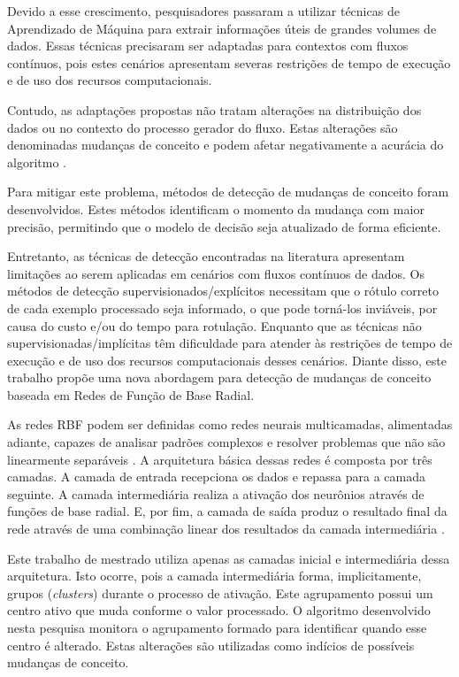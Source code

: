 \documentclass[msc, classic, a4paper]{ufbathesis}
\begin{document}
Devido a esse crescimento, pesquisadores passaram a utilizar técnicas de Aprendizado de Máquina para extrair informações úteis de grandes volumes de dados.
Essas técnicas precisaram ser adaptadas para contextos com fluxos contínuos, pois estes cenários apresentam severas restrições de tempo de execução e de uso dos recursos computacionais.

Contudo, as adaptações propostas não tratam alterações na distribuição dos dados ou no contexto do processo gerador do fluxo.
Estas alterações são denominadas mudanças de conceito e podem afetar negativamente a acurácia do algoritmo \cite{Gama:2014:SCD:2597757.2523813}.

Para mitigar este problema, métodos de detecção de mudanças de conceito foram desenvolvidos.
Estes métodos identificam o momento da mudança com maior precisão, permitindo que o modelo de decisão seja atualizado de forma eficiente.

Entretanto, as técnicas de detecção encontradas na literatura apresentam limitações ao serem aplicadas em cenários com fluxos contínuos de dados.
Os métodos de detecção supervisionados/explícitos necessitam que o rótulo correto de cada exemplo processado seja informado, o que pode torná-los inviáveis, por causa do custo e/ou do tempo para rotulação.
Enquanto que as técnicas não supervisionadas/implícitas têm dificuldade para atender às restrições de tempo de execução e de uso dos recursos computacionais desses cenários.
Diante disso, este trabalho propõe uma nova abordagem para detecção de mudanças de conceito baseada em Redes de Função de Base Radial.

As redes RBF podem ser definidas como redes neurais multicamadas, alimentadas adiante, capazes de analisar padrões complexos e resolver problemas que não são linearmente separáveis \cite{Braga:RedesNeuraisTeoriaAplicacoes}.
A arquitetura básica dessas redes é composta por três camadas.
A camada de entrada recepciona os dados e repassa para a camada seguinte.
A camada intermediária realiza a ativação dos neurônios através de funções de base radial.
E, por fim, a camada de saída produz o resultado final da rede através de uma combinação linear dos resultados da camada intermediária \cite{Rojas:1996:NNS:235222}.

Este trabalho de mestrado utiliza apenas as camadas inicial e intermediária dessa arquitetura.
Isto ocorre, pois a camada intermediária forma, implicitamente, grupos (\textit{clusters}) durante o processo de ativação.
Este agrupamento possui um centro ativo que muda conforme o valor processado.
O algoritmo desenvolvido nesta pesquisa monitora o agrupamento formado para identificar quando esse centro é alterado.
Estas alterações são utilizadas como indícios de possíveis mudanças de conceito.
\end{document}
